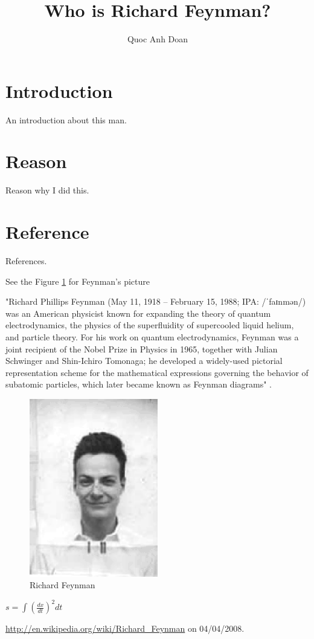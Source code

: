 \documentclass [a4paper,twoside,12pt]{article}
\author{Quoc Anh Doan}
\title{Who is Richard Feynman?}
\begin{document}
\maketitle

\tableofcontents
\section{Introduction}
An introduction about this man.
\section{Reason}
Reason why I did this.
\section{Reference}
References.
\newpage

See the Figure \ref{fig:feynman} for Feynman's picture 
	
"Richard Phillips Feynman (May 11, 1918 – February 15, 1988; IPA: /ˈfaɪnmən/) was an American physicist known for expanding the theory of quantum electrodynamics, the physics of the superfluidity of supercooled liquid helium, and particle theory. For his work on quantum electrodynamics, Feynman was a joint recipient of the Nobel Prize in Physics in 1965, together with Julian Schwinger and Shin-Ichiro Tomonaga; he developed a widely-used pictorial representation scheme for the mathematical expressions governing the behavior of subatomic particles, which later became known as Feynman diagrams" \cite{wiki}.


\begin{figure}[t]
  \begin{center}
    \includegraphics[width=0.5\textwidth]{graph}
    \caption{Richard Feynman}
    \label{fig:feynman}
  \end{center}
\end{figure}

\newpage

\begin{math}
s= \int (\frac{dx}{dt})^2 dt
\end{math}

\newpage
\begin{thebibliography}{9}
 

 
\url{http://en.wikipedia.org/wiki/Richard_Feynman}
 on 04/04/2008.



\end{thebibliography}

\end{document}

